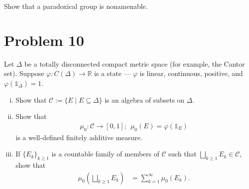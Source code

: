 \documentclass[10pt]{extarticle}
\newcommand{\R}{\mathbb{R}}
\begin{document}
  Show that a paradoxical group is nonamenable.
  \section{Problem 10}%
  Let $\Delta$ be a totally disconnected compact metric space (for example, the Cantor set). Suppose $\varphi: C(\Delta)\rightarrow \R$ is a state --- $\varphi$ is linear, continuous, positive, and $\varphi\left(\mathbb{1}_{\Delta}\right) = 1$.
  \begin{enumerate}[(i)]
    \item Show that $\mathcal{C} := \{E\mid E\subseteq \Delta\}$ is an algebra of subsets on $\Delta$.
    \item Show that
      \begin{align*}
        \mu_0: \mathcal{C}\rightarrow [0,1];~~\mu_0(E) = \varphi\left(\mathbb{1}_{E}\right)
      \end{align*}
      is a well-defined finitely additive measure.
    \item If $\{E_k\}_{k\geq 1}$ is a countable family of members of $\mathcal{C}$ such that $\bigsqcup_{k\geq 1}E_k \in \mathcal{C}$, show that
      \begin{align*}
        \mu_0\left(\bigsqcup_{k\geq 1}E_k\right) &= \sum_{k=1}^{\infty}\mu_0(E_k).
      \end{align*}
  \end{enumerate}
\end{document}

